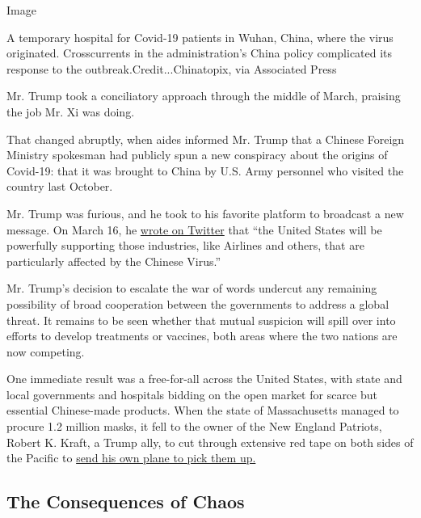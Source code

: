 Image

A temporary hospital for Covid-19 patients in Wuhan, China, where the
virus originated. Crosscurrents in the administration's China policy
complicated its response to the outbreak.Credit...Chinatopix, via
Associated Press

Mr. Trump took a conciliatory approach through the middle of March,
praising the job Mr. Xi was doing.

That changed abruptly, when aides informed Mr. Trump that a Chinese
Foreign Ministry spokesman had publicly spun a new conspiracy about the
origins of Covid-19: that it was brought to China by U.S. Army personnel
who visited the country last October.

Mr. Trump was furious, and he took to his favorite platform to broadcast
a new message. On March 16, he
\href{https://twitter.com/realDonaldTrump/status/1239685852093169664?ref_src=twsrc\%5Etfw\%7Ctwcamp\%5Etweetembed\%7Ctwterm\%5E1239685852093169664\&ref_url=https\%3A\%2F\%2Fwww.bloomberg.com\%2Fnews\%2Farticles\%2F2020-03-17\%2Ftrump-s-chinese-virus-tweet-adds-fuel-to-fire-with-beijing}{wrote
on Twitter} that ``the United States will be powerfully supporting those
industries, like Airlines and others, that are particularly affected by
the Chinese Virus.''

Mr. Trump's decision to escalate the war of words undercut any remaining
possibility of broad cooperation between the governments to address a
global threat. It remains to be seen whether that mutual suspicion will
spill over into efforts to develop treatments or vaccines, both areas
where the two nations are now competing.

One immediate result was a free-for-all across the United States, with
state and local governments and hospitals bidding on the open market for
scarce but essential Chinese-made products. When the state of
Massachusetts managed to procure 1.2 million masks, it fell to the owner
of the New England Patriots, Robert K. Kraft, a Trump ally, to cut
through extensive red tape on both sides of the Pacific to
\href{https://www.nytimes.com/aponline/2020/04/02/sports/football/ap-fbn-patriots-masks-assist.html}{send
his own plane to pick them up.}

\hypertarget{the-consequences-of-chaos}{%
\subsection{The Consequences of Chaos}\label{the-consequences-of-chaos}}

